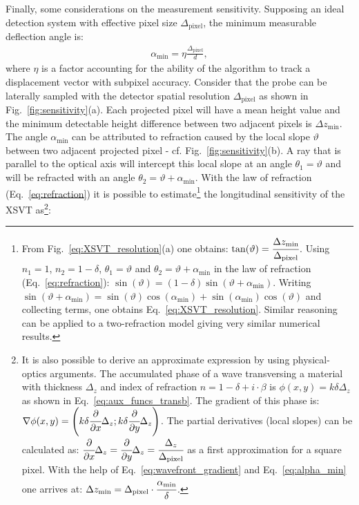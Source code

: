 \begin{refsection}
Finally, some considerations on the measurement sensitivity. Supposing an ideal detection system with effective pixel size $\Delta_\text{pixel}$, the minimum measurable deflection angle is:
\begin{align}\label{eq:alpha_min}
    \alpha_\text{min}=\eta\frac{\Delta_\text{pixel}}{d},
\end{align}
where $\eta$ is a factor accounting for the ability of the algorithm to track a displacement vector with subpixel accuracy. Consider that the probe can be laterally sampled with the detector spatial resolution $\Delta_\text{pixel}$ as shown in Fig.~\ref{fig:sensitivity}(a). Each projected pixel will have a mean height value and the minimum detectable height difference between two adjacent pixels is $\Delta{z_{\text{min}}}$. The angle $\alpha_\text{min}$ can be attributed to refraction caused by the local slope $\vartheta$ between two adjacent projected pixel - cf. Fig.~\ref{fig:sensitivity}(b). A ray that is parallel to the optical axis will intercept this local slope at an angle $\theta_1=\vartheta$ and will be refracted with an angle $\theta_2=\vartheta+\alpha_\text{min}$. With the law of refraction (Eq.~\ref{eq:refraction}) it is possible to estimate\footnote{From Fig.~\ref{eq:XSVT_resolution}(a) one obtains: $\tan(\vartheta)=\cfrac{\Delta{z_{\text{min}}}}{\Delta_\text{pixel}}$. Using $n_1=1$, $n_2=1-\delta$, $\theta_1=\vartheta$ and  $\theta_2=\vartheta+\alpha_\text{min}$ in the law of refraction (Eq.~\ref{eq:refraction}): $\sin(\vartheta)=(1-\delta)\sin(\vartheta+\alpha_\text{min})$. Writing $\sin(\vartheta+\alpha_\text{min})=\sin(\vartheta)\cos(\alpha_\text{min})+\sin(\alpha_\text{min})\cos(\vartheta)$ and collecting terms, one obtains Eq.~\ref{eq:XSVT_resolution}. Similar reasoning can be applied to a two-refraction model giving very similar numerical results.} the longitudinal sensitivity of the XSVT as\footnote{It is also possible to derive an approximate expression by using physical-optics arguments. The accumulated phase of a wave transversing a material with thickness $\Delta_z$ and index of refraction $n=1-\delta+i\cdot\beta$ is $\phi(x,y)=k\delta\Delta_z$ as shown in Eq.~\ref{eq:aux_funcs_transb}. The gradient of this phase is: $\nabla \phi(x,y)=\Bigg(k\delta\cfrac{\partial}{\partial x}\Delta_z; k\delta\cfrac{\partial}{\partial y}\Delta_z\Bigg)$. The partial derivatives (local slopes) can be calculated as: $\cfrac{\partial}{\partial x}\Delta_z = \cfrac{\partial}{\partial y}\Delta_z = \cfrac{\Delta_z}{ \Delta_\text{pixel}}$ as a first approximation for a square pixel. With the help of Eq.~\ref{eq:wavefront_gradient} and Eq.~\ref{eq:alpha_min} one arrives at: $\Delta{z_{\text{min}}}=\Delta_\text{pixel}\cdot\cfrac{\alpha_\text{min}}{\delta}$.}: 

\end{refsection}
